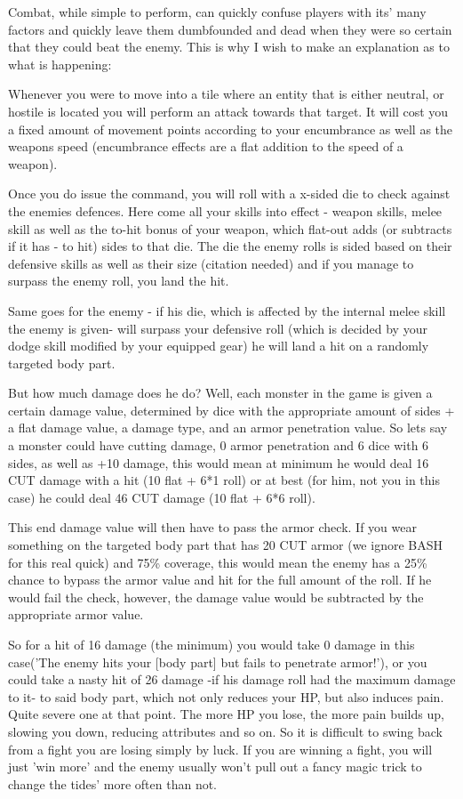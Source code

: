 Combat, while simple to perform, can quickly confuse players with its' many factors and quickly leave them dumbfounded and dead when they were so certain that they could beat the enemy. This is why I wish to make an explanation as to what is happening:

Whenever you were to move into a tile where an entity that is either neutral, or hostile is located you will perform an attack towards that target. It will cost you a fixed amount of movement points according to your encumbrance as well as the weapons speed (encumbrance effects are a flat addition to the speed of a weapon).

Once you do issue the command, you will roll with a x-sided die to check against the enemies defences. Here come all your skills into effect - weapon skills, melee skill as well as the to-hit bonus of your weapon, which flat-out adds (or subtracts if it has - to hit) sides to that die. The die the enemy rolls is sided based on their defensive skills as well as their size (citation needed) and if you manage to surpass the enemy roll, you land the hit.

Same goes for the enemy - if his die, which is affected by the internal melee skill the enemy is given- will surpass your defensive roll (which is decided by your dodge skill modified by your equipped gear) he will land a hit on a randomly targeted body part.

But how much damage does he do? Well, each monster in the game is given a certain damage value, determined by dice with the appropriate amount of sides + a flat damage value, a damage type, and an armor penetration value. So lets say a monster could have cutting damage, 0 armor penetration and 6 dice with 6 sides, as well as +10 damage, this would mean at minimum he would deal 16 CUT damage with a hit (10 flat + 6*1 roll) or at best (for him, not you in this case) he could deal 46 CUT damage (10 flat + 6*6 roll).

This end damage value will then have to pass the armor check. If you wear something on the targeted body part that has 20 CUT armor (we ignore BASH for this real quick) and 75\% coverage, this would mean the enemy has a 25\% chance to bypass the armor value and hit for the full amount of the roll. If he would fail the check, however, the damage value would be subtracted by the appropriate armor value.

So for a hit of 16 damage (the minimum) you would take 0 damage in this case('The enemy hits your [body part] but fails to penetrate armor!'), or you could take a nasty hit of 26 damage -if his damage roll had the maximum damage to it- to said body part, which not only reduces your HP, but also induces pain. Quite severe one at that point. The more HP you lose, the more pain builds up, slowing you down, reducing attributes and so on. So it is difficult to swing back from a fight you are losing simply by luck. If you are winning a fight, you will just 'win more' and the enemy usually won't pull out a fancy magic trick to change the tides' more often than not.

